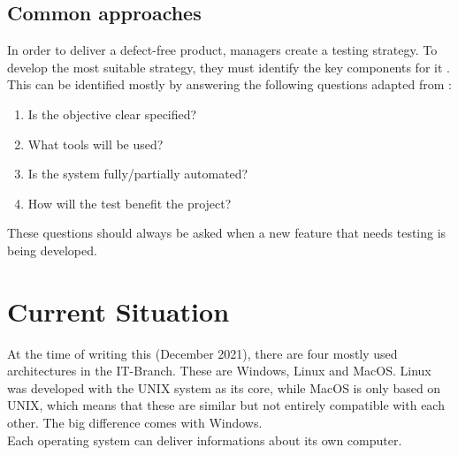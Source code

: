 \subsection{Common approaches}
In order to deliver a defect-free product, managers create a testing strategy.
To develop the most suitable strategy, they must identify the key components for it . This can be identified mostly by answering the following questions adapted from \cite{10.1007/978-981-10-8848-3_46}:
\begin{enumerate}
	\item Is the objective clear specified?
	\item What tools will be used?
	\item Is the system fully/partially automated?
	\item How will the test benefit the project?
\end{enumerate}
These questions should always be asked when a new feature that needs testing is being developed.
\section{Current Situation} 
At the time of writing this (December 2021), there are four mostly used architectures in the IT-Branch. These are Windows, Linux and MacOS. Linux was developed with the UNIX system as its core, while MacOS is only based on UNIX, which means that these are similar but not entirely compatible with each other. The big difference comes with Windows.\\
Each operating system can deliver informations about its own computer.


